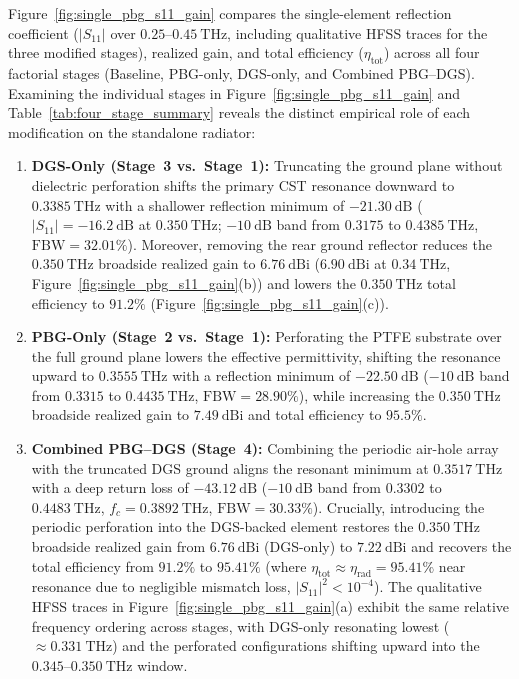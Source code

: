 \documentclass[referee,pdflatex,sn-mathphys-ay]{sn-jnl}
\begin{document}
Figure~\ref{fig:single_pbg_s11_gain} compares the single-element reflection coefficient (\(|S_{11}|\) over $0.25$--$0.45~\mathrm{THz}$, including qualitative HFSS traces for the three modified stages), realized gain, and total efficiency ($\eta_{\mathrm{tot}}$) across all four factorial stages (Baseline, PBG-only, DGS-only, and Combined PBG--DGS). Examining the individual stages in Figure~\ref{fig:single_pbg_s11_gain} and Table~\ref{tab:four_stage_summary} reveals the distinct empirical role of each modification on the standalone radiator:
\begin{enumerate}
    \item \textbf{DGS-Only (Stage~3 vs.\ Stage~1):} Truncating the ground plane without dielectric perforation shifts the primary CST resonance downward to \(0.3385~\mathrm{THz}\) with a shallower reflection minimum of \(-21.30~\mathrm{dB}\) (\(|S_{11}| = -16.2~\mathrm{dB}\) at $0.350~\mathrm{THz}$; \(-10~\mathrm{dB}\) band from \(0.3175\) to \(0.4385~\mathrm{THz}\), \(\mathrm{FBW} = 32.01\%\)). Moreover, removing the rear ground reflector reduces the $0.350~\mathrm{THz}$ broadside realized gain to \(6.76~\mathrm{dBi}\) ($6.90~\mathrm{dBi}$ at $0.34~\mathrm{THz}$, Figure~\ref{fig:single_pbg_s11_gain}(b)) and lowers the $0.350~\mathrm{THz}$ total efficiency to \(91.2\%\) (Figure~\ref{fig:single_pbg_s11_gain}(c)).
    \item \textbf{PBG-Only (Stage~2 vs.\ Stage~1):} Perforating the PTFE substrate over the full ground plane lowers the effective permittivity, shifting the resonance upward to \(0.3555~\mathrm{THz}\) with a reflection minimum of \(-22.50~\mathrm{dB}\) (\(-10~\mathrm{dB}\) band from \(0.3315\) to \(0.4435~\mathrm{THz}\), \(\mathrm{FBW} = 28.90\%\)), while increasing the $0.350~\mathrm{THz}$ broadside realized gain to \(7.49~\mathrm{dBi}\) and total efficiency to \(95.5\%\).
    \item \textbf{Combined PBG--DGS (Stage~4):} Combining the periodic air-hole array with the truncated DGS ground aligns the resonant minimum at \(0.3517~\mathrm{THz}\) with a deep return loss of \(-43.12~\mathrm{dB}\) (\(-10~\mathrm{dB}\) band from \(0.3302\) to \(0.4483~\mathrm{THz}\), \(f_c = 0.3892~\mathrm{THz}\), \(\mathrm{FBW} = 30.33\%\)). Crucially, introducing the periodic perforation into the DGS-backed element restores the $0.350~\mathrm{THz}$ broadside realized gain from \(6.76~\mathrm{dBi}\) (DGS-only) to \(7.22~\mathrm{dBi}\) and recovers the total efficiency from \(91.2\%\) to \(95.41\%\) (where $\eta_{\mathrm{tot}} \approx \eta_{\mathrm{rad}} = 95.41\%$ near resonance due to negligible mismatch loss, $|S_{11}|^{2} < 10^{-4}$). The qualitative HFSS traces in Figure~\ref{fig:single_pbg_s11_gain}(a) exhibit the same relative frequency ordering across stages, with DGS-only resonating lowest ($\approx 0.331~\mathrm{THz}$) and the perforated configurations shifting upward into the $0.345$--$0.350~\mathrm{THz}$ window.
\end{enumerate}
\end{document}
